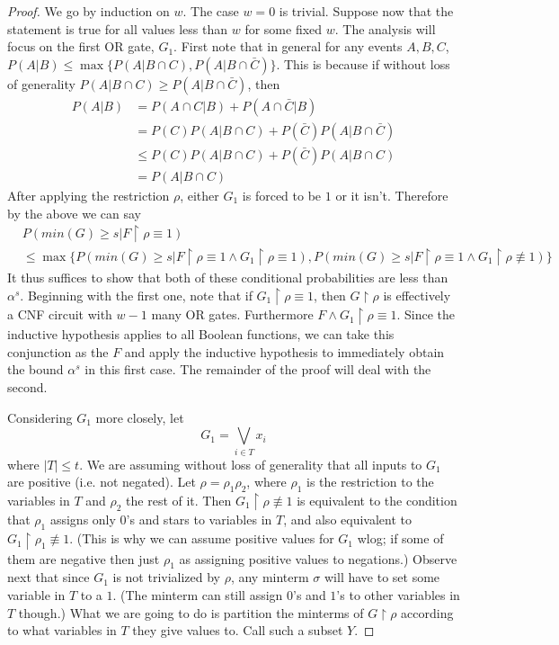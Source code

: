 \documentclass{article}
\theoremstyle{definition}
\theoremstyle{plain}
\theoremstyle{theorem}
\begin{document}
\begin{proof}
	We go by induction on $w$. The case $w=0$ is trivial. Suppose now that the statement is true for all values less than $w$ for some fixed $w$. The analysis will focus on the first OR gate, $G_1$.  First note that in general for any events $A,B,C$, $P(A|B) \leq \max\{P(A|B\cap C),P(A|B \cap \bar{C})\}$. This is because if without loss of generality $P(A|B \cap C) \geq P(A|B \cap \bar{C})$, then
	\begin{align*}
		P(A|B) &= P(A\cap C|B)+P(A \cap \bar{C}|B) \\
			&= P(C)P(A|B \cap C) + P(\bar{C})P(A|B\cap \bar{C}) \\
			&\leq P(C)P(A|B \cap C)+ P(\bar{C})P(A|B \cap C) \\
			&= P(A|B \cap C) 
	\end{align*}
After applying the restriction $\rho$, either $G_1$ is forced to be $1$ or it isn't. Therefore by the above we can say 
\begin{align*}
	 & P(min(G) \geq s | F \restriction \rho \equiv 1) \\
	 	&\leq \max\{P(min(G) \geq s | F \restriction \rho \equiv 1 \wedge G_1 \restriction \rho \equiv 1), P(min(G) \geq s | F\restriction \rho \equiv 1 \wedge G_1\restriction \rho \not\equiv 1)\}
\end{align*}
It thus suffices to show that both of these conditional probabilities are less than $\alpha^s$. Beginning with the first one, note that if $G_1 \restriction \rho \equiv 1$, then $G \restriction \rho$ is effectively a CNF circuit with $w-1$ many OR gates. Furthermore $F \wedge G_1 \restriction \rho \equiv 1$. Since the inductive hypothesis applies to all Boolean functions, we can take this conjunction as the $F$ and apply the inductive hypothesis to immediately obtain the bound $\alpha^s$ in this first case. The remainder of the proof will deal with the second. \par 
Considering $G_1$ more closely, let 
\[ G_1 = \bigvee_{i\in T} x_i \]
where $|T| \leq t$. We are assuming without loss of generality that all inputs to $G_1$ are positive (i.e. not negated). Let $\rho = \rho_1 \rho_2$, where $\rho_1$ is the restriction to the variables in $T$ and $\rho_2$ the rest of it. Then $G_1 \restriction \rho \not\equiv 1$ is equivalent to the condition that $\rho_1$ assigns only $0$'s and stars to variables in $T$, and also equivalent to $G_1 \restriction \rho_1 \not\equiv 1$. (This is why we can assume positive values for $G_1$ wlog; if some of them are negative then just $\rho_1$ as assigning positive values to negations.) Observe next that since $G_1$ is not trivialized by $\rho$, any minterm $\sigma$ will have to set some variable in $T$ to a $1$. (The minterm can still assign $0$'s and $1$'s to other variables in $T$ though.) What we are going to do is partition the minterms of $G\restriction \rho$ according to what variables in $T$ they give values to. Call such a subset $Y$. \par

\end{proof}
\end{document}
